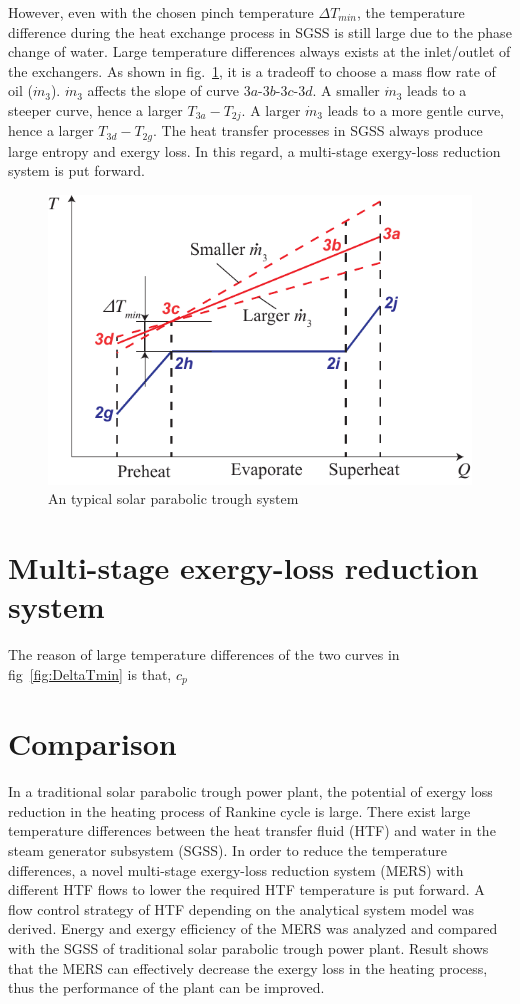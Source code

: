 However, even with the chosen pinch temperature $\Delta T_{min}$, the temperature difference during the heat exchange process in SGSS is still large due to the phase change of water. Large temperature differences always exists at the inlet/outlet of the exchangers. As shown in fig.~\ref{fig:DeltaT}, it is a tradeoff to choose a mass flow rate of oil ($\dot{m}_3$). $\dot{m}_3$ affects the slope of curve $3a$-$3b$-$3c$-$3d$. A smaller $\dot{m}_3$ leads to a steeper curve, hence a larger $T_{3a} - T_{2j}$. A larger $\dot{m}_3$ leads to a more gentle curve, hence a larger $T_{3d} - T_{2g}$. The heat transfer processes in SGSS always produce large entropy and exergy loss. In this regard, a multi-stage exergy-loss reduction system is put forward.

\noindent \begin{figure}[htbp]
\begin{center}
	\includegraphics[width = 0.7\columnwidth]{fig/DeltaT}
	\caption{An typical solar parabolic trough system}
	\label{fig:DeltaT}
\end{center}
\end{figure}

\section{Multi-stage exergy-loss reduction system}
The reason of large temperature differences of the two curves in fig~\ref{fig:DeltaTmin} is that, $c_p$
\section{Comparison}

In a traditional solar parabolic trough power plant, the potential of exergy loss reduction in the heating process of Rankine cycle is large. There exist large temperature differences between the heat transfer fluid (HTF) and water in the steam generator subsystem (SGSS). In order to reduce the temperature differences, a novel multi-stage exergy-loss reduction system (MERS) with different HTF flows to lower the required HTF temperature is put forward. A flow control strategy of HTF depending on the analytical system model was derived. Energy and exergy efficiency of the MERS was analyzed and compared with the SGSS of traditional solar parabolic trough power plant. Result shows that the MERS can effectively decrease the exergy loss in the heating process, thus the performance of the plant can be improved.


